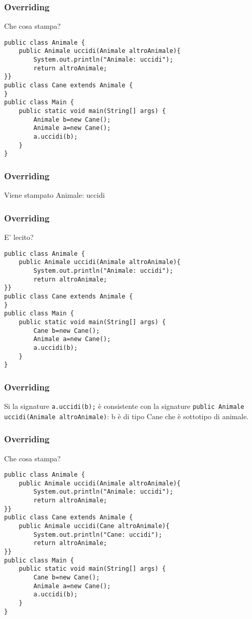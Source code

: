 \documentclass{beamer}
\begin{document}
\begin{frame}[fragile]
\frametitle{Overriding}
\begin{framed}
Che cosa stampa?
\begin{lstlisting}
public class Animale {
    public Animale uccidi(Animale altroAnimale){
        System.out.println("Animale: uccidi");
        return altroAnimale;
}}
public class Cane extends Animale {
}
public class Main {
    public static void main(String[] args) {
        Animale b=new Cane();
        Animale a=new Cane();
        a.uccidi(b);
    }
}
\end{lstlisting}
\end{framed}
\end{frame}

\begin{frame}[fragile]
\frametitle{Overriding}
\begin{framed}
Viene stampato Animale: uccidi
\end{framed}
\end{frame}

\begin{frame}[fragile]
\frametitle{Overriding}
\begin{framed}
E' lecito?
\begin{lstlisting}
public class Animale {
    public Animale uccidi(Animale altroAnimale){
        System.out.println("Animale: uccidi");
        return altroAnimale;
}}
public class Cane extends Animale {
}
public class Main {
    public static void main(String[] args) {
        Cane b=new Cane();
        Animale a=new Cane();
        a.uccidi(b);
    }
}
\end{lstlisting}
\end{framed}
\end{frame}

\begin{frame}[fragile]
\frametitle{Overriding}
\begin{framed}
Si la signature \texttt{a.uccidi(b);} \`e consistente con la signature
 \texttt{public Animale uccidi(Animale altroAnimale)}: b \`e di tipo Cane che \`e sottotipo di animale.
\end{framed}
\end{frame}

\begin{frame}[fragile]
\frametitle{Overriding}
\begin{framed}
Che cosa stampa?
\begin{lstlisting}
public class Animale {
    public Animale uccidi(Animale altroAnimale){
        System.out.println("Animale: uccidi");
        return altroAnimale;
}}
public class Cane extends Animale {
    public Animale uccidi(Cane altroAnimale){
        System.out.println("Cane: uccidi");
        return altroAnimale;
}}
public class Main {
    public static void main(String[] args) {
        Cane b=new Cane();
        Animale a=new Cane();
        a.uccidi(b);
    }
}
\end{lstlisting}
\end{framed}
\end{frame}
\end{document}
